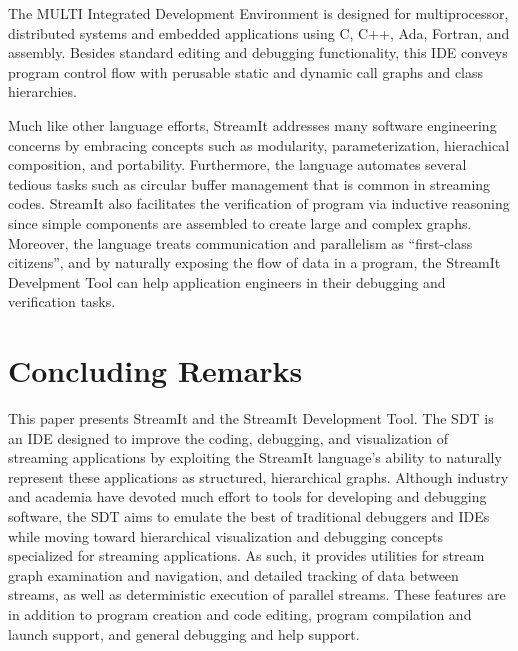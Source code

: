 \documentclass[11pt, letterpaper, onecolumn]{article}
\begin{document}
The MULTI Integrated Development Environment is designed for
multiprocessor, distributed systems and embedded applications using C,
C++,  Ada,  Fortran,  and   assembly.  Besides  standard  editing  and
debugging functionality,  this IDE  conveys program control  flow with
perusable  static and dynamic  call graphs  and class  hierarchies.

Much  like other  language efforts,  StreamIt addresses  many software
engineering  concerns  by   embracing  concepts  such  as  modularity,
parameterization,         hierachical         composition,         and
portability. Furthermore, the language automates several tedious tasks
such as circular buffer management  that is common in streaming codes.
StreamIt also  facilitates the  verification of program  via inductive
reasoning since  simple components are  assembled to create  large and
complex  graphs.   Moreover,  the  language treats  communication  and
parallelism as ``first-class citizens'', and by naturally exposing the
flow  of data  in a  program, the  StreamIt Develpment  Tool  can help
application engineers in their debugging and verification tasks.


\section{Concluding Remarks}
\label{sec:cr}

This paper  presents StreamIt and  the StreamIt Development  Tool. The
SDT  is  an  IDE  designed  to  improve  the  coding,  debugging,  and
visualization  of streaming  applications by  exploiting  the StreamIt
language's  ability  to  naturally  represent  these  applications  as
structured, hierarchical graphs.   Although industry and academia have
devoted much  effort to tools  for developing and  debugging software,
the SDT  aims to  emulate the best  of traditional debuggers  and IDEs
while moving toward  hierarchical visualization and debugging concepts
specialized  for   streaming  applications.   As   such,  it  provides
utilities for  stream graph  examination and navigation,  and detailed
tracking of  data between streams, as well  as deterministic execution
of  parallel  streams.  These  features  are  in  addition to  program
creation and code editing, program compilation and launch support, and
general debugging and help support.
\end{document}
